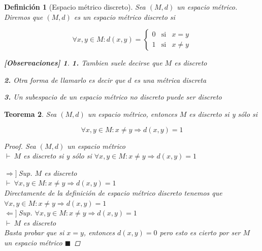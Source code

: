 \documentclass[oneside]{book} %
\theoremstyle{Teorema}
\newtheorem{Definicion}{Definición}[chapter]
\newtheorem{Teorema}[Definicion]{Teorema}
\theoremstyle{Ejemplos}
\theoremstyle{[Obs]}
\newtheorem*{Obs}{[Observaciones]}
\renewcommand{\{}{\left\lbrace} %
\renewcommand{\}}{\right\rbrace} %
\renewcommand{\qed}{$\blacksquare$} %
\newcommand{\pd}{$\vdash\ $} %
\newcommand{\necesidad}{$\Rightarrow]\ $} %
\newcommand{\suficiencia}{$\Leftarrow]\ $} %
\begin{document}
			\begin{Definicion}[Espacio métrico discreto]\setlength{\parindent}{0em}
			
				Sea $(M, d)$ un espacio métrico. Diremos que $(M, d)$ es un espacio métrico discreto si 

				\[ \forall x, y \in M : d(x, y) = \{ \begin{array}{lcc}
					0 & \text{si} & x = y \\ 
					1 & \text{si} & x \neq y
				\end{array} \right. \]

				\begin{Obs}
				
					\textbf{1.} Tambien suele decirse que $M$ es discreto 

					\textbf{2.} Otra forma de llamarlo es decir que $d$ es una métrica discreta 

					\textbf{3.} Un subespacio de un espacio métrico no discreto puede ser discreto
				
				\end{Obs}
			
			\end{Definicion}

			\begin{Teorema}\setlength{\parindent}{0em}
			
				Sea $(M, d)$ un espacio métrico, entonces $M$ es discreto si y sólo si 
				
				\[ \forall x, y \in M : x \neq y \Rightarrow d(x, y) = 1 \]

				\begin{proof}
					
					Sea $(M, d)$ un espacio métrico \\ 
					\pd $M$ es discreto si y sólo si $\forall x, y \in M : x \neq y \Rightarrow d(x, y) = 1$ 

					\necesidad Sup. $M$ es discreto \\ 
					\pd $\forall x, y \in M : x \neq y \Rightarrow d(x, y) = 1$ \\ 
					Directamente de la definición de espacio métrico discreto tenemos que $\forall x, y \in M : x \neq y \Rightarrow d(x, y) = 1$ \\ 

					\suficiencia Sup. $\forall x, y \in M : x \neq y \Rightarrow d(x, y) = 1$ \\ 
					\pd $M$ es discreto \\ 
					Basta probar que si $x = y$, entonces $d(x, y) = 0$ pero esto es cierto por ser $M$ un espacio métrico \qed

				\end{proof}
			
			\end{Teorema}
\end{document}
